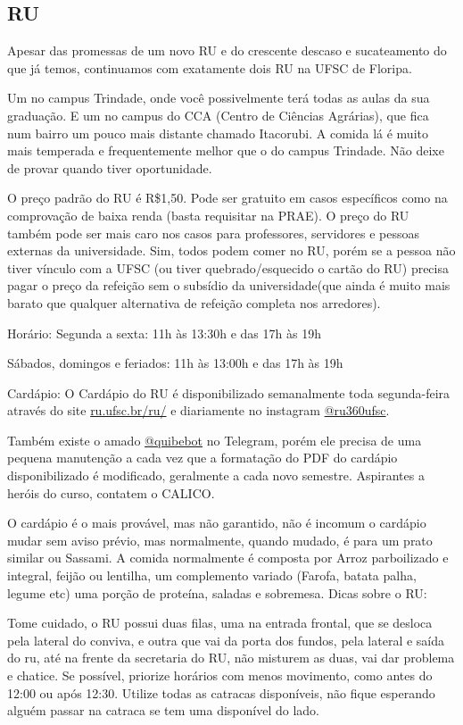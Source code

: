 \subsection{RU}

Apesar das promessas de um novo RU e do crescente descaso e sucateamento do que já temos, continuamos com exatamente dois RU na UFSC de Floripa.

Um no campus Trindade, onde você possivelmente terá todas as aulas da sua graduação.
E um no campus do CCA (Centro de Ciências Agrárias), que fica num bairro um pouco mais distante chamado Itacorubi. A comida lá é muito mais temperada e frequentemente melhor que o do campus Trindade. Não deixe de provar quando tiver oportunidade.

O preço padrão do RU é R\$1,50. Pode ser gratuito em casos específicos como na comprovação de baixa renda (basta requisitar na PRAE).
O preço do RU também pode ser mais caro nos casos para professores, servidores e pessoas externas da universidade.
Sim, todos podem comer no RU, porém se a pessoa não tiver vínculo com a UFSC (ou tiver quebrado/esquecido o cartão do RU) precisa pagar o preço da refeição sem o subsídio da universidade(que ainda é muito mais barato que qualquer alternativa de refeição completa nos arredores).

Horário:
Segunda a sexta: 11h às 13:30h e das 17h às 19h

Sábados, domingos e feriados: 11h às 13:00h e das 17h às 19h

Cardápio:
O Cardápio do RU é disponibilizado semanalmente toda segunda-feira através do site \href{https://ru.ufsc.br/ru/}{ru.ufsc.br/ru/} e diariamente no instagram \href{https://www.instagram.com/ru360ufsc/}{@ru360ufsc}.

Também existe o amado \href{https://t.me/quibebot}{@quibebot} no Telegram, porém ele precisa de uma pequena manutenção a cada vez que a formatação do PDF do cardápio disponibilizado é modificado, geralmente a cada novo semestre. Aspirantes a heróis do curso, contatem o CALICO.

O cardápio é o mais provável, mas não garantido, não é incomum o cardápio mudar sem aviso prévio, mas normalmente, quando mudado, é para um prato similar ou Sassami.
A comida normalmente é composta por Arroz parboilizado e integral, feijão ou lentilha, um complemento variado (Farofa, batata palha, legume etc) uma porção de proteína, saladas e sobremesa. 
Dicas sobre o RU: 

Tome cuidado, o RU possui duas filas, uma na entrada frontal, que se desloca pela lateral do conviva, e outra que vai da porta dos fundos, pela lateral e saída do ru, até na frente da secretaria do RU, não misturem as duas, vai dar problema e chatice.
Se possível, priorize horários com menos movimento, como antes do 12:00 ou após 12:30.
Utilize todas as catracas disponíveis, não fique esperando alguém passar na catraca se tem uma disponível do lado.

